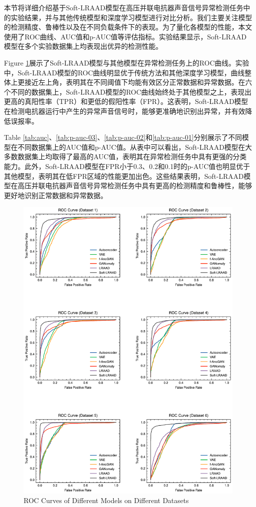 \documentclass{article}
\begin{document}
本节将详细介绍基于Soft-LRAAD模型在高压并联电抗器声音信号异常检测任务中的实验结果，并与其他传统模型和深度学习模型进行对比分析。我们主要关注模型的检测精度、鲁棒性以及在不同负载条件下的表现。为了量化各模型的性能，本文使用了ROC曲线、AUC值和p-AUC值等评估指标。实验结果显示，Soft-LRAAD模型在多个实验数据集上均表现出优异的检测性能。

Figure \ref{fig:roc_curve}展示了Soft-LRAAD模型与其他模型在异常检测任务上的ROC曲线。实验中，Soft-LRAAD模型的ROC曲线明显优于传统方法和其他深度学习模型，曲线整体上更接近左上角，表明其在不同阈值下均能有效区分正常数据和异常数据。在六个不同的数据集上，Soft-LRAAD模型的ROC曲线始终处于其他模型之上，表现出更高的真阳性率（TPR）和更低的假阳性率（FPR）。这表明，Soft-LRAAD模型在检测电抗器运行中产生的异常声音信号时，能够更准确地识别出异常，并有效降低误报率。

Table \ref{tab:auc}、\ref{tab:p-auc-03}、\ref{tab:p-auc-02}和\ref{tab:p-auc-01}分别展示了不同模型在不同数据集上的AUC值和p-AUC值。从表中可以看出，Soft-LRAAD模型在大多数数据集上均取得了最高的AUC值，表明其在异常检测任务中具有更强的分类能力。此外，Soft-LRAAD模型在FPR小于0.3、0.2和0.1时的p-AUC值也明显优于其他模型，表明其在低FPR区域的性能更加出色。这些结果表明，Soft-LRAAD模型在高压并联电抗器声音信号异常检测任务中具有更高的检测精度和鲁棒性，能够更好地识别正常数据和异常数据。

\begin{figure}[H]
    \centering
    \includegraphics[width=\textwidth]{./roc_curve.pdf}
    \caption{ROC Curves of Different Models on Different Datasets}
    \label{fig:roc_curve}
\end{figure}
\end{document}
